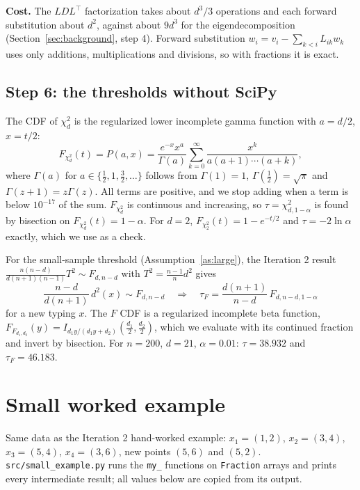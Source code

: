\documentclass[11pt]{article}
\theoremstyle{definition}
\newcommand{\T}{^{\top}}
\begin{document}
\noindent\textbf{Cost.} The $LDL\T$ factorization takes about $d^3/3$ operations and each forward substitution about $d^2$, against about $9d^3$ for the eigendecomposition (Section~\ref{sec:background}, step 4). Forward substitution $w_i=v_i-\sum_{k<i}L_{ik}w_k$ uses only additions, multiplications and divisions, so with fractions it is exact.

\subsection{Step 6: the thresholds without SciPy}
The CDF of $\chi^2_d$ is the regularized lower incomplete gamma function with $a=d/2$, $x=t/2$:
\begin{equation}\label{eq:chi2cdf}
F_{\chi^2_d}(t)=P(a,x)=\frac{e^{-x}x^a}{\Gamma(a)}\sum_{k=0}^\infty\frac{x^k}{a(a+1)\cdots(a+k)},
\end{equation}
where $\Gamma(a)$ for $a\in\{\tfrac12,1,\tfrac32,\dots\}$ follows from $\Gamma(1)=1$, $\Gamma(\tfrac12)=\sqrt\pi$ and $\Gamma(z+1)=z\Gamma(z)$. All terms are positive, and we stop adding when a term is below $10^{-17}$ of the sum. $F_{\chi^2_d}$ is continuous and increasing, so $\tau=\chi^2_{d,1-\alpha}$ is found by bisection on $F_{\chi^2_d}(t)=1-\alpha$. For $d=2$, $F_{\chi^2_2}(t)=1-e^{-t/2}$ and $\tau=-2\ln\alpha$ exactly, which we use as a check.

For the small-sample threshold (Assumption~\ref{as:large}), the Iteration 2 result $\frac{n(n-d)}{d(n+1)(n-1)}T^2\sim F_{d,n-d}$ with $T^2=\frac{n-1}{n}d^2$ gives
\begin{equation}\label{eq:tauF}
\frac{n-d}{d(n+1)}\,d^2(x)\sim F_{d,n-d}\quad\Longrightarrow\quad \tau_F=\frac{d(n+1)}{n-d}\,F_{d,n-d,1-\alpha}
\end{equation}
for a new typing $x$. The $F$ CDF is a regularized incomplete beta function, $F_{F_{d_1,d_2}}(y)=I_{d_1y/(d_1y+d_2)}(\tfrac{d_1}2,\tfrac{d_2}2)$, which we evaluate with its continued fraction \cite{nr} and invert by bisection. For $n=200$, $d=21$, $\alpha=0.01$: $\tau=38.932$ and $\tau_F=46.183$.

\section{Small worked example}\label{sec:small}
Same data as the Iteration 2 hand-worked example: $x_1=(1,2)$, $x_2=(3,4)$, $x_3=(5,4)$, $x_4=(3,6)$, new points $(5,6)$ and $(5,2)$. \texttt{src/small\_example.py} runs the \texttt{my\_} functions on \texttt{Fraction} arrays and prints every intermediate result; all values below are copied from its output.
\end{document}
